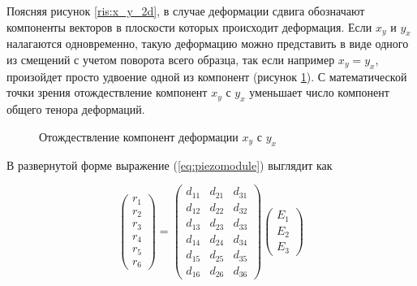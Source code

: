 Поясняя рисунок \ref{ris:x_y_2d}, в случае деформации сдвига обозначают
компоненты векторов в плоскости которых происходит деформация. Если $x_y$ и $y_x$
налагаются одновременно, такую деформацию можно представить в виде одного из
смещений с учетом поворота всего образца, так если например $x_y = y_x$, произойдет
просто удвоение одной из компонент (рисунок \ref{ris:2x_y_1}). С математической
точки зрения отождествление компонент $x_y$ с $y_x$ уменьшает число компонент
общего тенора деформаций.

\begin{figure}[H]
  \centering
  \hfill
  \caption{Отождествление компонент деформации $x_y$ с $y_x$ }
  \label{ris:2x_y_1}
\end{figure}

В развернутой форме выражение (\ref{eq:piezomodule}) выглядит как

\begin{equation}
  \begin{pmatrix}
  r_1 \\
  r_2 \\
  r_3 \\
  r_4 \\
  r_5 \\
  r_6
  \end{pmatrix}
   = \begin{pmatrix}
  d_{11} & d_{21}  & d_{31} \\
  d_{12} & d_{22}  & d_{32} \\
  d_{13} & d_{23}  & d_{33} \\
  d_{14} & d_{24}  & d_{34} \\
  d_{15} & d_{25}  & d_{35} \\
  d_{16} & d_{26}  & d_{36}
  \end{pmatrix}
  \begin{pmatrix}
  E_1 \\
  E_2 \\
  E_3
  \end{pmatrix}
  \label{eq:piezomodule_matrica}
\end{equation}

